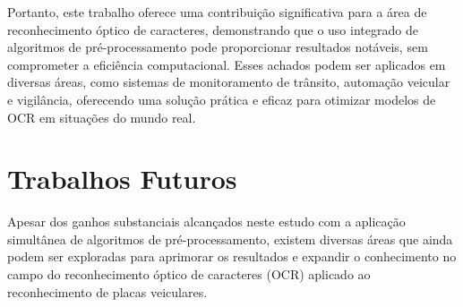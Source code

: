 \documentclass[conference]{IEEEtran}
\begin{document}
Portanto, este trabalho oferece uma contribuição significativa para a área de reconhecimento óptico de caracteres, demonstrando que o uso integrado de algoritmos de pré-processamento pode proporcionar resultados notáveis, sem comprometer a eficiência computacional. Esses achados podem ser aplicados em diversas áreas, como sistemas de monitoramento de trânsito, automação veicular e vigilância, oferecendo uma solução prática e eficaz para otimizar modelos de OCR em situações do mundo real.

\section{Trabalhos Futuros}

Apesar dos ganhos substanciais alcançados neste estudo com a aplicação simultânea de algoritmos de pré-processamento, existem diversas áreas que ainda podem ser exploradas para aprimorar os resultados e expandir o conhecimento no campo do reconhecimento óptico de caracteres (OCR) aplicado ao reconhecimento de placas veiculares.
\end{document}
